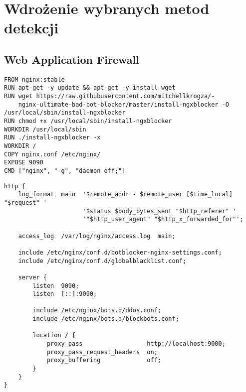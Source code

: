 \newpage


\section{Wdrożenie wybranych metod detekcji}\label{sec:wdrozenie-metod-detekcji}

\subsection{Web Application Firewall}

\begin{figure*}[p]
    \begin{listing}[H]
        \begin{verbatim}
FROM nginx:stable
RUN apt-get -y update && apt-get -y install wget
RUN wget https://raw.githubusercontent.com/mitchellkrogza/-
    nginx-ultimate-bad-bot-blocker/master/install-ngxblocker -O /usr/local/sbin/install-ngxblocker
RUN chmod +x /usr/local/sbin/install-ngxblocker
WORKDIR /usr/local/sbin
RUN ./install-ngxblocker -x
WORKDIR /
COPY nginx.conf /etc/nginx/
EXPOSE 9090
CMD ["nginx", "-g", "daemon off;"]
        \end{verbatim}
        \caption{}
        \label{lst:nginx-bot-blocker-dockerfile}
    \end{listing}

    \begin{listing}[H]
        \begin{verbatim}
http {
    log_format  main  '$remote_addr - $remote_user [$time_local] "$request" '
                      '$status $body_bytes_sent "$http_referer" '
                      '"$http_user_agent" "$http_x_forwarded_for"';

    access_log  /var/log/nginx/access.log  main;

    include /etc/nginx/conf.d/botblocker-nginx-settings.conf;
    include /etc/nginx/conf.d/globalblacklist.conf;

    server {
	    listen  9090;
	    listen  [::]:9090;

	    include /etc/nginx/bots.d/ddos.conf;
        include /etc/nginx/bots.d/blockbots.conf;

	    location / {
		    proxy_pass                  http://localhost:9000;
		    proxy_pass_request_headers  on;
		    proxy_buffering             off;
	    }
    }
}
        \end{verbatim}
        \caption{}
        \label{lst:nginx-bot-blocker-conf}
    \end{listing}
\end{figure*}

